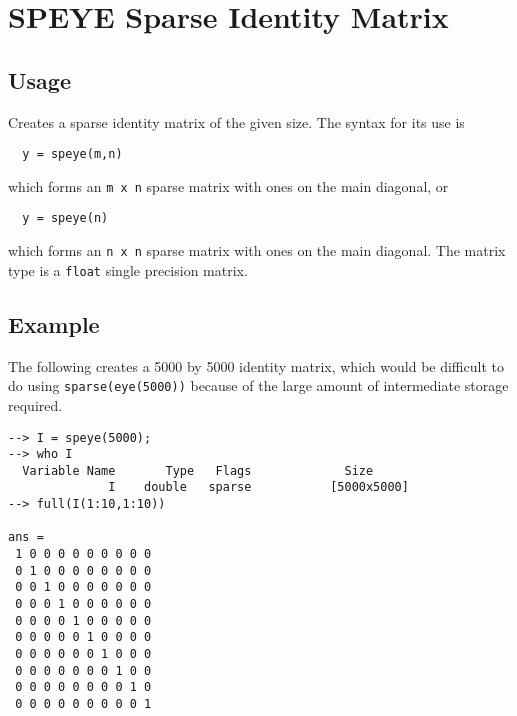 \section{SPEYE Sparse Identity Matrix}

\subsection{Usage}

Creates a sparse identity matrix of the given size.  The syntax for
its use is
\begin{verbatim}
  y = speye(m,n)
\end{verbatim}
which forms an \verb|m x n| sparse matrix with ones on the main diagonal,
or
\begin{verbatim}
  y = speye(n)
\end{verbatim}
which forms an \verb|n x n| sparse matrix with ones on the main diagonal.  The
matrix type is a \verb|float| single precision matrix.
\subsection{Example}

The following creates a 5000 by 5000 identity matrix, which would be
difficult to do using \verb|sparse(eye(5000))| because of the large amount
of intermediate storage required.
\begin{verbatim}
--> I = speye(5000);
--> who I
  Variable Name       Type   Flags             Size
              I    double   sparse           [5000x5000]
--> full(I(1:10,1:10))

ans = 
 1 0 0 0 0 0 0 0 0 0 
 0 1 0 0 0 0 0 0 0 0 
 0 0 1 0 0 0 0 0 0 0 
 0 0 0 1 0 0 0 0 0 0 
 0 0 0 0 1 0 0 0 0 0 
 0 0 0 0 0 1 0 0 0 0 
 0 0 0 0 0 0 1 0 0 0 
 0 0 0 0 0 0 0 1 0 0 
 0 0 0 0 0 0 0 0 1 0 
 0 0 0 0 0 0 0 0 0 1 
\end{verbatim}
